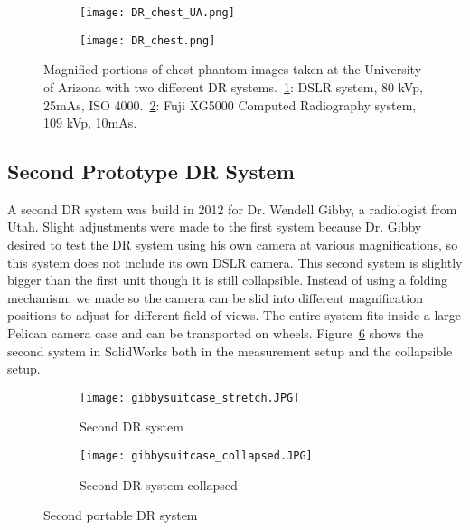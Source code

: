 \begin{figure}[h]
\centering
	\begin{subfigure}[b]{0.45\linewidth}
	\centering
	\texttt{[image: DR\_chest\_UA.png]}
	\caption{}
	\label{fig:DR_chest_film}
	\end{subfigure}
	\hspace{1 cm}
	\begin{subfigure}[b]{0.45\linewidth}
	\texttt{[image: DR\_chest.png]}
	\caption{}
	\label{fig:DR_chest}
	\end{subfigure}
\caption{Magnified portions of chest-phantom images taken at the University of Arizona with two different DR systems.~\ref{fig:DR_chest_film}: DSLR system, 80 kVp, 25mAs, ISO 4000.~\ref{fig:DR_chest}: Fuji XG5000 Computed Radiography system, 109 kVp, 10mAs.}
\label{fig:DR_chest_both}
\end{figure}

\subsection{Second Prototype DR System}
A second DR system was build in 2012 for Dr. Wendell Gibby, a radiologist from Utah.  Slight adjustments were made to the first system because Dr. Gibby desired to test the DR system using his own camera at various magnifications, so this system does not include its own DSLR camera.  This second system is slightly bigger than the first unit though it is still collapsible.  Instead of using a folding mechanism, we made so the camera can be slid into different magnification positions to adjust for different field of views.  The entire system fits inside a large Pelican camera case and can be transported on wheels.  Figure~\ref{fig:DR2} shows the second system in SolidWorks both in the measurement setup and the collapsible setup.

\begin{figure}[h]
	\begin{subfigure}[b]{0.45\linewidth}
	\centering
	\texttt{[image: gibbysuitcase\_stretch.JPG]}
	\caption{Second DR system}
	\label{DR2stretched}
	\end{subfigure}
\hspace{0.2cm}
	\begin{subfigure}[b]{0.45\linewidth}
	\centering
	\texttt{[image: gibbysuitcase\_collapsed.JPG]}
	\caption{Second DR system collapsed}
	\label{fig:DR2collapsed}
	\end{subfigure}
\caption{Second portable DR system}
\label{fig:DR2}	
\end{figure}

